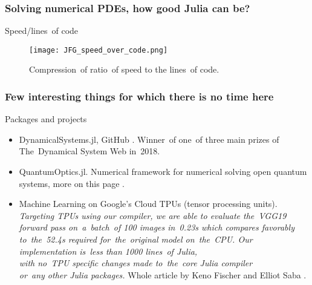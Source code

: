 \documentclass{beamer}  %
\begin{document}
\begin{frame}
  \frametitle{Solving numerical PDEs, how good Julia can be?}

  \begin{block}{Speed/lines~of code}
    \begin{figure}
      \centering

      \texttt{[image: JFG\_speed\_over\_code.png]}
      \caption{Compression~of ratio~of speed to the lines~of code.}
    \end{figure}
  \end{block}

\end{frame}










\begin{frame}
  \frametitle{Few interesting things for which there is no time here}

  \begin{block}{Packages and projects}
    \begin{itemize}
    \item DynamicalSystems.jl, GitHub
      .
      Winner~of one~of three main prizes of The~Dynamical System Web
      in~2018.
    \item QuantumOptics.jl. Numerical framework for numerical solving
      open quantum systems, more on this page
      .
    \item Machine Learning on Google's Cloud TPUs (tensor processing
      units). \\
      \emph{Targeting TPUs using our compiler, we are able to evaluate
        the~VGG19 forward pass on~a~batch~of 100 images in~0.23s which
        compares favorably to~the~52.4s required for~the~original
        model on~the~CPU. Our implementation is~less than 1000
        lines~of Julia, \\
        with no~TPU specific changes made to~the~core
        Julia compiler \\
        or~any other Julia packages.} Whole article by Keno Fischer
      and Elliot Saba
      .
    \end{itemize}
  \end{block}

\end{frame}
\end{document}
